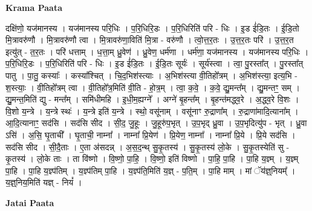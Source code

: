 \documentclass[17pt]{extarticle}
\begin{document}
\textbf{Krama Paata} \newline

दक्षि॑णो॒ यज॑मानस्य । यज॑मानस्य परि॒धिः । प॒रि॒धिरि॒डः । प॒रि॒धिरिति॑ परि - धिः । इ॒ड ई॑डि॒तः । ई॒डि॒तो मि॒त्रावरु॑णौ । मि॒त्रावरु॑णौ त्वा । मि॒त्रावरु॑णा॒विति॑ मि॒त्रा - वरु॑णौ । त्वो॒त्त॒र॒तः । उ॒त्त॒र॒तः परि॑ । उ॒त्त॒र॒त इत्यु॑त् - त॒र॒तः । परि॑ धत्ताम् । ध॒त्ता॒म् ध्रु॒वेण॑ । ध्रु॒वेण॒ धर्म॑णा । धर्म॑णा॒ यज॑मानस्य । यज॑मानस्य परि॒धिः । प॒रि॒धिरि॒डः । प॒रि॒धिरिति॑ परि - धिः । इ॒ड ई॑डि॒तः । ई॒डि॒तः सूर्यः॑ । सूर्य॑स्त्वा । त्वा॒ पु॒रस्ता᳚त् । पु॒रस्ता᳚त् पातु । पा॒तु॒ कस्याः᳚ । कस्या᳚श्चित् । चि॒द॒भिश॑स्त्याः । अ॒भिश॑स्त्या वी॒तिहो᳚त्रम् । अ॒भिश॑स्त्या॒ इत्य॒भि - श॒स्त्याः॒ । वी॒तिहो᳚त्रम् त्वा । वी॒तिहो᳚त्र॒मिति॑ वी॒ति - हो॒त्र॒म् । त्वा॒ क॒वे॒ । क॒वे॒ द्यु॒मन्त᳚म् । द्यु॒मन्तꣳ॒॒ सम् । द्यु॒मन्त॒मिति॑ द्यु - मन्त᳚म् । समि॑धीमहि । इ॒धी॒म॒ह्यग्ने᳚ । अग्ने॑ बृ॒हन्त᳚म् । बृ॒हन्त॑मद्ध्व॒रे । अ॒द्ध्व॒रे वि॒शः । वि॒शो य॒न्त्रे । य॒न्त्रे स्थः॑ । य॒न्त्रे इति॑ य॒न्त्रे । स्थो॒ वसू॑नाम् । वसू॑नाꣳ रु॒द्राणा᳚म् । रु॒द्राणा॑मादि॒त्याना᳚म् । आ॒दि॒त्यानाꣳ॒॒ सद॑सि । सद॑सि सीद । सी॒द॒ जु॒हूः । जु॒हूरु॑प॒भृत् । उ॒प॒भृद् ध्रु॒वा । उ॒प॒भृदित्यु॑प - भृत् । ध्रु॒वा ऽसि॑ । अ॒सि॒ घृ॒ताची᳚ । घृ॒ताची॒ नाम्ना᳚ । नाम्ना᳚ प्रि॒येण॑ । प्रि॒येण॒ नाम्ना᳚ । नाम्ना᳚ प्रि॒ये । प्रि॒ये सद॑सि । सद॑सि सीद । सी॒दै॒ताः । ए॒ता अ॑सदन्न् । अ॒स॒द॒न्थ् सु॒कृ॒तस्य॑ । सु॒कृ॒तस्य॑ लो॒के । सु॒कृ॒तस्येति॑ सु - कृ॒तस्य॑ । लो॒के ताः । ता वि॑ष्णो । वि॒ष्णो॒ पा॒हि॒ । वि॒ष्णो॒ इति॑ विष्णो । पा॒हि॒ पा॒हि । पा॒हि य॒ज्ञ्म् । य॒ज्ञ्म् पा॒हि । पा॒हि य॒ज्ञ्प॑तिम् । य॒ज्ञ्प॑तिम् पा॒हि । य॒ज्ञ्प॑ति॒मिति॑ य॒ज्ञ् - प॒ति॒म् । पा॒हि माम् । मां ॅय॑ज्ञ्॒नियम्᳚ । य॒ज्ञ्॒निय॒मिति॑ यज्ञ् - नियं᳚ । \newline

\textbf{Jatai Paata} \newline
\end{document}
